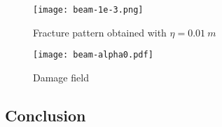 \begin{figure}[htbp]
\centering
\texttt{[image: beam-1e-3.png]}
\caption{Fracture pattern obtained with $\eta=\SI{0.01}{m}$} \label{fig:beamell0x11e-3}
\end{figure}

\begin{figure}[htbp]
\centering
\texttt{[image: beam-alpha0.pdf]}
\caption{Damage field} \label{fig:beam-alpha0}
\end{figure}

\subsection*{Conclusion}


